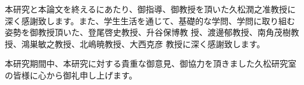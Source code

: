 \acknowledgment
本研究と本論文を終えるにあたり、御指導、御教授を頂いた久松潤之准教授に
深く感謝致します。また、学生生活を通じて、基礎的な学問、学問に取り組む
姿勢を御教授頂いた、登尾啓史教授、升谷保博教
授、渡邊郁教授、南角茂樹教授、鴻巣敏之教授、北嶋暁教授、大西克彦
教授に深く感謝致します。

本研究期間中、本研究に対する貴重な御意見、御協力を頂きました久松研究室
の皆様に心から御礼申し上げます。
